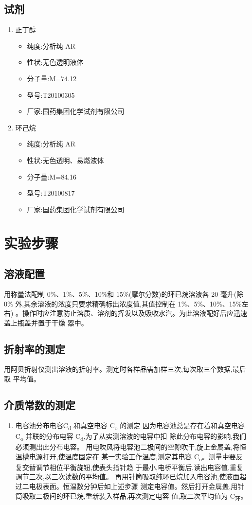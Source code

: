 \documentclass[11pt]{report}
\begin{document}
\section{试剂}
\label{sec:org7a7ac5c}
\begin{enumerate}
\item 正丁醇
\label{sec:orgf19802e}
\begin{itemize}
\item 纯度:分析纯 AR
\item 性状:无色透明液体
\item 分子量:M=74.12
\item 型号:T20100305
\item 厂家:国药集团化学试剂有限公司
\end{itemize}
\item 环己烷
\label{sec:orgc5d7acf}
\begin{itemize}
\item 纯度:分析纯 AR
\item 性状:无色透明、易燃液体
\item 分子量:M=84.16
\item 型号:T20100817
\item 厂家:国药集团化学试剂有限公司
\end{itemize}
\end{enumerate}

\chapter{实验步骤}
\label{sec:org43ec225}
\section{溶液配置}
\label{sec:org070f5c2}
    用称量法配制 0\%、1\%、5\%、10\%和 15\%(摩尔分数)的环已烷溶液各 20 毫升(除 0\%
外,其余溶液的浓度只要求精确标出浓度值,其值控制在 1\%、5\%、10\%、15\%左右)
 。操作时应注意防止溶质、溶剂的挥发以及吸收水汽。为此溶液配好后应迅速盖上瓶盖并置于干燥
器中。
\section{折射率的测定}
\label{sec:org7fc8707}
用阿贝折射仪测出溶液的折射率。测定时各样品需加样三次,每次取三个数据,最后取
平均值。
\section{介质常数的测定}
\label{sec:org5a2a94f}
\begin{enumerate}
\item 电容池分布电容C\textsubscript{d} 和真空电容 C\textsubscript{o} 的测定
\label{sec:orgd6b88dc}
因为电容池总是存在着和真空电容 C\textsubscript{o} 并联的分布电容 C\textsubscript{d},为了从实测溶液的电容中扣
除此分布电容的影响,我们必须测出此分布电容。
用电吹风将电容池二极间的空隙吹干,旋上金属盖,将恒温槽电源打开,使温度固定在
某一实验工作温度,测定其电容 C\textsubscript{o}。测量中要反复交替调节相位平衡旋钮,使表头指针趋
于最小,电桥平衡后,读出电容值,重复调节三次,以三次读数的平均值。
再用针筒吸取纯环已烷加入电容池,使液面超过二电极表面。恒温数分钟后如上述步骤
测定电容值。然后打开金属盖,用针筒吸取二极间的环已烷,重新装入样品,再次测定电容
值,取二次平均值为 C\textsubscript{环}。
\end{enumerate}
\end{document}
